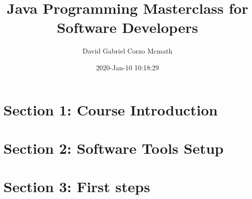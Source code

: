 \documentclass{book}
\title{Java Programming Masterclass for Software Developers}
\author{David Gabriel Corzo Mcmath}
\date{2020-Jan-10 10:18:29}
\begin{document}
\maketitle
\tableofcontents

\chapter{Section 1: Course Introduction}


\chapter{Section 2: Software Tools Setup}


\chapter{Section 3: First steps}

\end{document}
